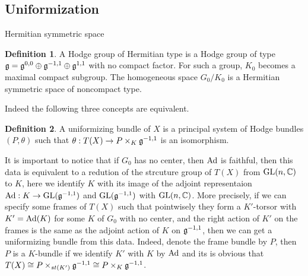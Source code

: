 \documentclass[aspectratio=169, 10pt]{beamer}
\theoremstyle{definition}
\newtheorem{Def}{Definition}
\theoremstyle{example}
\begin{document}
	\subsection{Uniformization}
	\begin{frame}{Hermitian symmetric space}
		\begin{Def}
			A Hodge group of Hermitian type is a Hodge group of type $\mathfrak{g}=\mathfrak{g}^{0,0}\oplus \mathfrak{g}^{-1,1}\oplus \mathfrak{g}^{1,1}$ with no compact factor. For such a group, $K_0$ becomes a maximal compact subgroup. The homogeneous space $G_0/K_0$ is a Hermitian symmetric space of noncompact type. 
		\end{Def}
		Indeed the following three concepts are equivalent.
		\begin{figure}[h]
			\centering
		\end{figure}
	\end{frame}
	\begin{frame}
		\begin{Def}
			A uniformizing bundle of $X$ is a principal system of Hodge bundles $(P,\theta)$ such that $\theta: T(X)\to P\times_K \mathfrak{g}^{-1,1}$ is an isomorphism.
		\end{Def}
		It is important to notice that if $G_0$ has no center, then $\operatorname{Ad}$ is faithful, then this data is equivalent to a redution of the strcuture group of $T(X)$ from $\operatorname{GL}(n,\mathbb{C})$ to $K$, here we identify $K$ with its image of the adjoint representaion $\operatorname{Ad}: K\to \operatorname{GL}(\mathfrak{g}^{-1,1})$ and $\operatorname{GL}(\mathfrak{g}^{-1,1})$ with $\operatorname{GL}(n,\mathbb{C})$. More precisely, if we can specify some frames of $T(X)$ such that pointwisely they form a $K'$-torsor with $K'=\operatorname{Ad}(K)$ for some $K$ of $G_0$ with no center, and the right action of $K'$ on the frames is the same as the adjoint action of $K$ on $\mathfrak{g}^{-1,1}$, then we can get a uniformizing bundle from this data. Indeed, denote the frame bundle by $P$, then $P$ is a $K$-bundle if we identify $K'$ with $K$ by $\operatorname{Ad}$ and its is obvious that $T(X)\cong P\times_{st(K')} \mathfrak{g}^{-1,1}\cong P\times_K \mathfrak{g}^{-1,1}$.
	\end{frame}
\end{document}
